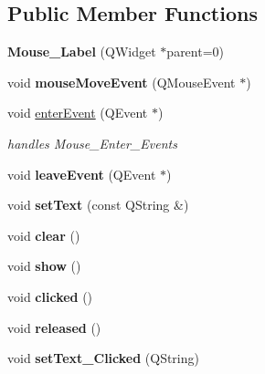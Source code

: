 \subsection*{Public Member Functions}
\begin{DoxyCompactItemize}
\item 
\hypertarget{class_mouse___label_a300817fe9336be51bb68dd459b4eb686}{}{\bfseries Mouse\+\_\+\+Label} (Q\+Widget $\ast$parent=0)\label{class_mouse___label_a300817fe9336be51bb68dd459b4eb686}

\item 
\hypertarget{class_mouse___label_a267dab64326b0c5d1848eba98b0c4387}{}void {\bfseries mouse\+Move\+Event} (Q\+Mouse\+Event $\ast$)\label{class_mouse___label_a267dab64326b0c5d1848eba98b0c4387}

\item 
\hypertarget{class_mouse___label_aadd45738c71820b588a0ce659b4dba53}{}void \hyperlink{class_mouse___label_aadd45738c71820b588a0ce659b4dba53}{enter\+Event} (Q\+Event $\ast$)\label{class_mouse___label_aadd45738c71820b588a0ce659b4dba53}

\begin{DoxyCompactList}\small\item\em handles Mouse\+\_\+\+Enter\+\_\+\+Events \end{DoxyCompactList}\item 
\hypertarget{class_mouse___label_a87b74f802603230653d82a8084feab4a}{}void {\bfseries leave\+Event} (Q\+Event $\ast$)\label{class_mouse___label_a87b74f802603230653d82a8084feab4a}

\item 
\hypertarget{class_mouse___label_a25ad1b0ac37207f97dd6a478d60e4a59}{}void {\bfseries set\+Text} (const Q\+String \&)\label{class_mouse___label_a25ad1b0ac37207f97dd6a478d60e4a59}

\item 
\hypertarget{class_mouse___label_a3549cef8115331be4878c1fbd1e3c545}{}void {\bfseries clear} ()\label{class_mouse___label_a3549cef8115331be4878c1fbd1e3c545}

\item 
\hypertarget{class_mouse___label_aef5357caf49cd907267cf487f31001cd}{}void {\bfseries show} ()\label{class_mouse___label_aef5357caf49cd907267cf487f31001cd}

\item 
\hypertarget{class_mouse___label_aa28066dbc97f4f6d9901db3ebd83fe59}{}void {\bfseries clicked} ()\label{class_mouse___label_aa28066dbc97f4f6d9901db3ebd83fe59}

\item 
\hypertarget{class_mouse___label_a39b104f8fad6c48f2546a3e6e405654d}{}void {\bfseries released} ()\label{class_mouse___label_a39b104f8fad6c48f2546a3e6e405654d}

\item 
\hypertarget{class_mouse___label_a4e0732ce949e5884cb459d660964136a}{}void {\bfseries set\+Text\+\_\+\+Clicked} (Q\+String)\label{class_mouse___label_a4e0732ce949e5884cb459d660964136a}

\end{DoxyCompactItemize}


